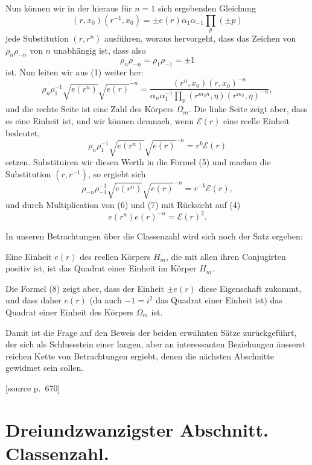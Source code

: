\documentclass[11pt]{article}
\newcommand{\srcpage}[1]{\par\medskip\noindent\textsf{[source p.~#1]}\par\smallskip}
\begin{document}
Nun können wir in der hieraus für $n=1$ sich ergebenden Gleichung
\[
(r,x_0)(r^{-1},x_0)=\pm e(r)\alpha_1\alpha_{-1}\prod_p(\pm p)
\]
jede Substitution $(r,r^n)$ ausführen, woraus hervorgeht, dass das Zeichen von $\rho_n\rho_{-n}$ von $n$ unabhängig ist, dass also
\begin{equation}
\rho_n\rho_{-n}=\rho_1\rho_{-1}=\pm1
\tag{4}
\end{equation}
ist. Nun leiten wir aus (1) weiter her:
\begin{equation}
\rho_n\rho_1^{-1}\sqrt{e(r^n)}\sqrt{e(r)}^{-n}=\frac{(r^n,x_0)(r,x_0)^{-n}}{\alpha_n\alpha_1^{-1}\prod_p(r^{m_2n},\eta)(r^{m_2},\eta)^{-n}},
\tag{5}
\end{equation}
und die rechte Seite ist eine Zahl des Körpers $\Omega_m$. Die linke Seite zeigt aber, dass es eine Einheit ist, und wir können demnach, wenn $\mathscr E(r)$ eine reelle Einheit bedeutet,
\begin{equation}
\rho_n\rho_1^{-1}\sqrt{e(r^n)}\sqrt{e(r)}^{-n}=r^k\mathscr E(r)
\tag{6}
\end{equation}
setzen. Substituiren wir diesen Werth in die Formel (5) und machen die Substitution $(r,r^{-1})$, so ergiebt sich
\begin{equation}
\rho_{-n}\rho_{-1}^{-1}\sqrt{e(r^n)}\sqrt{e(r)}^{-n}=r^{-k}\mathscr E(r),
\tag{7}
\end{equation}
und durch Multiplication von (6) und (7) mit Rücksicht auf (4)
\begin{equation}
e(r^n)e(r)^{-n}=\mathscr E(r)^2.
\tag{8}
\end{equation}

In unseren Betrachtungen über die Classenzahl wird sich noch der Satz ergeben:
\begin{center}
Eine Einheit $e(r)$ des reellen Körpers $H_m$, die mit allen ihren Conjugirten positiv ist, ist das Quadrat einer Einheit im Körper $H_m$.
\end{center}
Die Formel (8) zeigt aber, dass der Einheit $\pm e(r)$ diese Eigenschaft zukommt, und dass daher $e(r)$ (da auch $-1=i^2$ das Quadrat einer Einheit ist) das Quadrat einer Einheit des Körpers $\Omega_m$ ist.

Damit ist die Frage auf den Beweis der beiden erwähnten Sätze zurückgeführt, der sich als Schlussstein einer langen, aber an interessanten Beziehungen äusserst reichen Kette von Betrachtungen ergiebt, denen die nächsten Abschnitte gewidmet sein sollen.

\srcpage{670}
\section*{Dreiundzwanzigster Abschnitt. Classenzahl.}
\end{document}
